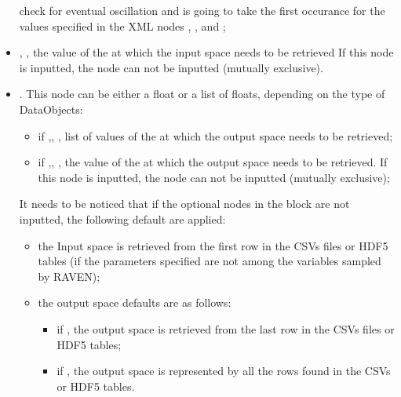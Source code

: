 \begin{itemize}
    check for eventual oscillation and is going to take the first occurance for
    the values specified in the XML nodes ,
    , and  ;
  \item {}, , the value of the  at which the input space needs to be retrieved
    If this node is inputted, the node   can not be inputted (mutually exclusive).
  \item {}. This node can be either a float or a list of floats, depending on the type of DataObjects:
   \begin{itemize}
      \item if ,, ,  list of values of the
                           at which the output space needs to be retrieved;
      \item if ,, ,  the value of the 
         at which the output space needs to be retrieved. If this node is inputted, the node   can not be inputted (mutually exclusive);
   \end{itemize}
  It needs to be noticed that if the optional nodes in the block  are not inputted, the following default are applied:
    \begin{itemize}
       \item the Input space is retrieved from the first row in the CSVs files or HDF5 tables (if the parameters specified are not among the variables sampled by RAVEN);
       \item  the output space defaults are as follows:
       \begin{itemize}
           \item if , the output space is retrieved from the last row in the CSVs files or HDF5 tables;
           \item if , the output space is represented by all the rows found in  the CSVs or HDF5 tables.
        \end{itemize}
    \end{itemize}
\end{itemize}

